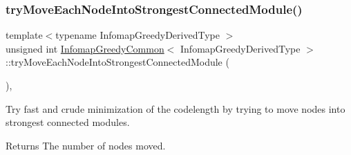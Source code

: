 \mbox{\label{classInfomapGreedyCommon_ac1026d8aaeb5a5ceeb6c272d6adba431}} 
\subsubsection{\texorpdfstring{try\+Move\+Each\+Node\+Into\+Strongest\+Connected\+Module()}{tryMoveEachNodeIntoStrongestConnectedModule()}}
{\footnotesize\ttfamily template$<$typename Infomap\+Greedy\+Derived\+Type $>$ \\
unsigned int \mbox{\hyperlink{classInfomapGreedyCommon}{Infomap\+Greedy\+Common}}$<$ Infomap\+Greedy\+Derived\+Type $>$\+::try\+Move\+Each\+Node\+Into\+Strongest\+Connected\+Module (\begin{DoxyParamCaption}{ }\end{DoxyParamCaption})\hspace{0.3cm}{\ttfamily [inline]}, {\ttfamily [protected]}}

Try fast and crude minimization of the codelength by trying to move nodes into strongest connected modules. \begin{DoxyReturn}{Returns}
The number of nodes moved. 
\end{DoxyReturn}

